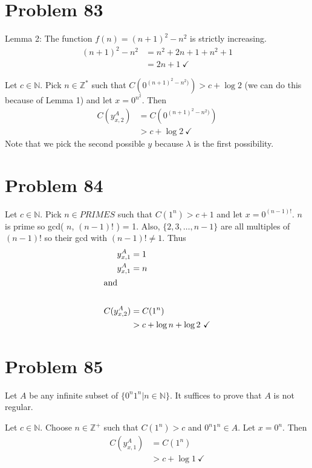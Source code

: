 \documentclass[11pt]{article}
\begin{document}
\section*{Problem 83}

Lemma 2: The function $f(n) = (n+1)^2 - n^2$ is strictly increasing.
	\begin{align*}
		(n+1)^2 - n^2 &= n^2 + 2n + 1 + n^2 + 1 \\
		&= 2n +1 \ \checkmark
	\end{align*}

Let $c \in \mathbb{N}$.
Pick $n \in \mathbb{Z^*}$ such that $C( 0^{(n+1)^2 - n^2)}) > c + \log 2$ (we can do this because of Lemma 1) and let $x= 0^{n^2}$.
Then
	\begin{align*}
		C(y _{x, 2} ^A) &= C( 0^{(n+1)^2 - n^2)}) \\
		&> c + \log 2 \ \checkmark
	\end{align*}
Note that we pick the second possible $y$ because $\lambda$ is the first possibility.


\section*{Problem 84}

Let $c \in \mathbb{N}$.
Pick $n \in PRIMES$ such that $C(1^n) > c + 1$ and let $x = 0 ^{(n-1)!}$.
$n$ is prime so gcd( $n$, $(n-1)!$ ) = 1.
Also, $\{2, 3, \dots, n-1\}$ are all multiples of $(n-1)!$ so their gcd with $(n-1)! \neq 1$.
Thus
	\begin{align*}
		y _{x,1} ^{A} &= 1 \\
		y _{x,1} ^{A} &= n \\
	\intertext{and} \\
		C( y _{x,2} ^{A} ) &= C(1^n) \\
		&> c + \log n + \log 2 \ \checkmark
	\end{align*}


\section*{Problem 85}

Let $A$ be any infinite subset of $\{ 0^n 1^n | n \in \mathbb{N} \}$.
It suffices to prove that $A$ is not regular.

Let $c \in \mathbb{N}$. Choose $n \in \mathbb{Z}^+$ such that $C(1^n) > c$ and $0^n 1^n \in A$.
Let $x = 0^n$.
Then
	\begin{align*}
		C(y_{x,1} ^A) &= C(1^n) \\
		&> c + \log 1 \ \checkmark
	\end{align*}
\end{document}
